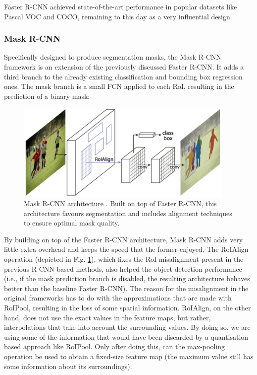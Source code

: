 Faster \ac{R-CNN} achieved state-of-the-art performance in popular datasets like Pascal \ac{VOC} and \ac{COCO}, remaining to this day as a very influential design.

\subsubsection{Mask \ac{R-CNN}}
\label{subsubsec:chap2_mask_rcnn}

Specifically designed to produce segmentation masks, the Mask \ac{R-CNN} framework \cite{mask_rcnn} is an extension of the previously discussed Faster \ac{R-CNN}. It adds a third branch to the already existing classification and bounding box regression ones. The mask branch is a small \ac{FCN} applied to each \ac{RoI}, resulting in the prediction of a binary mask:

\begin{figure}[h]
\centering
\includegraphics[width=300pt]{figures/figure_9.pdf}
\caption{Mask \ac{R-CNN} architecture \cite{mask_rcnn}. Built on top of Faster \ac{R-CNN}, this architecture favours segmentation and includes alignment techniques to ensure optimal mask quality.}
\label{fig:mask_r_cnn}
\end{figure}

By building on top of the Faster \ac{R-CNN} architecture, Mask \ac{R-CNN} adds very little extra overhead and keeps the speed that the former enjoyed. The \ac{RoIAlign} operation (depicted in Fig. \ref{fig:mask_r_cnn}), which fixes the \ac{RoI} misalignment present in the previous \ac{R-CNN} based methods, also helped the object detection performance (i.e., if the mask prediction branch is disabled, the resulting architecture behaves better than the baseline Faster \ac{R-CNN}). The reason for the misalignment in the original frameworks has to do with the approximations that are made with \ac{RoIPool}, resulting in the loss of some spatial information. \ac{RoIAlign}, on the other hand, does not use the exact values in the feature maps, but rather, interpolations that take into account the surrounding values. By doing so, we are using some of the information that would have been discarded by a quantisation based approach like \ac{RoIPool}. Only after doing this, can the max-pooling operation be used to obtain a fixed-size feature map (the maximum value still has some information about its surroundings).\\


